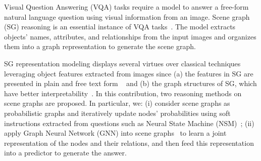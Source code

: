 \documentclass[letterpaper]{article} %
\begin{document}
Visual Question Answering (VQA) tasks require a model to answer a free-form natural language question using visual information from an image. Scene graph (SG) reasoning is an essential instance of VQA tasks~\cite{DBLP:journals/corr/abs-2007-01072}. 
The model extracts objects' names, attributes, and relationships from the input images and organizes them into a graph representation to generate the scene graph.

SG representation modeling displays several virtues over classical techniques leveraging object features extracted from images since (a) the features in SG are presented in plain and free text form ~\cite{DBLP:journals/corr/abs-2101-05479} and (b) the graph structures of SG, which have better interpretability~\cite{DBLP:conf/bmvc/ZhangCX19}.
In this contribution, two reasoning methods on scene graphs are proposed. In particular, we: (i) consider scene graphs as probabilistic graphs and iteratively update nodes' probabilities using soft instructions extracted from questions such as Neural State Machine (NSM)~\cite{DBLP:conf/nips/HudsonM19,DBLP:conf/ijcnn/LeLV020}; (ii) apply Graph Neural Network (GNN) into scene graphs~\cite{inproceedings,DBLP:conf/iccv/LiGCL19} to learn a joint representation of the nodes and their relations, and then feed this representation into a predictor to generate the answer. 
\end{document}
